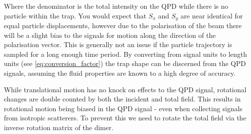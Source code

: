 Where the denominator is the total intensity on the QPD while there is 
no particle within the trap. You would expect that $S_x$ and $S_y$ are
near identical for equal particle displacements, however due to the 
polarisation of the beam there will be a slight bias to the signals 
for motion along the direction of the polarisation vector. This is 
generally not an issue if the particle trajectory is sampled for a 
long enough time period. By converting from signal units to length
units (see \eqref{eq:conversion_factor}) the trap shape can be 
discerned from the QPD signals, assuming the fluid properties are
known to a high degree of accuracy.

While translational motion has no knock on effects to the QPD signal, 
rotational changes are double counted by both the incident and total 
field. This results in rotational motion being biased in the QPD signal 
- even when collecting signals from isotropic scatterers. To prevent 
this we need to rotate the total field via the inverse rotation matrix
of the dimer.

